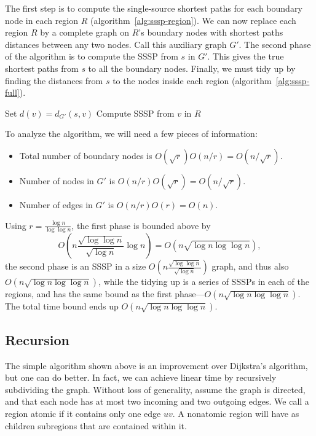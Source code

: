 \documentclass[12pt]{article}
\begin{document}
The first step is to compute the single-source shortest paths for each boundary node in each region $R$ (algorithm~\ref{alg:sssp-region}). We can now replace each region $R$ by a complete graph on $R$'s boundary nodes with shortest paths distances between any two nodes. Call this auxiliary graph $G'$. The second phase of the algorithm is to compute the SSSP from $s$ in $G'$. This gives the true shortest paths from $s$ to all the boundary nodes. Finally, we must tidy up by finding the distances from $s$ to the nodes inside each region (algorithm~\ref{alg:sssp-full}).

\begin{algorithm}[!htb]
  \label{alg:sssp-full}
  \begin{algorithmic}
        \State Set $d(v) = d_{G'}(s,v)$
        \State Compute SSSP from $v$ in $R$
      \EndFor
    \EndFor
  \end{algorithmic}
\end{algorithm}

To analyze the algorithm, we will need a few pieces of information:
\begin{itemize}
\item Total number of boundary nodes is $O(\sqrt{r})O(n/r) = O(n/\sqrt{r})$.
\item Number of nodes in $G'$ is $O(n/r)O(\sqrt{r})=O(n/\sqrt{r})$.
\item Number of edges in $G'$ is $O(n/r)O(r) = O(n)$.
\end{itemize}

Using $r=\frac{\log n}{\log \log n}$, the first phase is bounded above by
\[
  O\left(n\frac{\sqrt{\log \log n}}{\sqrt{\log n}} \log n\right)= O(n \sqrt{\log n \log \log n}),
\]
the second phase is an SSSP in a size $O(n \frac{\sqrt{\log \log n}}{\sqrt{\log n}})$ graph, and thus also $O(n \sqrt{\log n \log \log n})$, while the tidying up is a series of SSSPs in each of the regions, and has the same bound as the first phase---$O(n \sqrt{\log n \log \log n})$. The total time bound ends up $O(n \sqrt{\log n \log \log n})$.

\subsection{Recursion}
\label{sec:recursion}

The simple algorithm shown above is an improvement over Dijkstra's algorithm, but one can do better. In fact, we can achieve linear time by recursively subdividing the graph. Without loss of generality, assume the graph is directed, and that each node has at most two incoming and two outgoing edges. We call a region atomic if it contains only one edge $uv$. A nonatomic region will have as children subregions that are contained within it.
\end{document}
